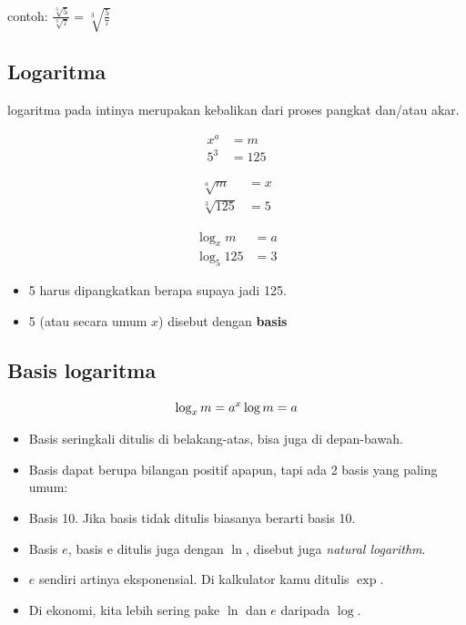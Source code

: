 \documentclass[
  letterpaper,
  DIV=11,
  numbers=noendperiod]{scrartcl}
\begin{document}
contoh: \(\frac{\sqrt[3]{5}}{\sqrt[3]{7}}=\sqrt[3]{\frac{5}{7}}\)

\subsection{Logaritma}\label{logaritma}

logaritma pada intinya merupakan kebalikan dari proses pangkat dan/atau
akar.

\[
\begin{align}
x^a &= m \\
5^3 &= 125
\end{align}
\]

\[
\begin{align}
\sqrt[a]{m} &= x \\
\sqrt[3]{125} &= 5
\end{align}
\]

\[
\begin{align}
\log_x {m} &= a \\
\log_5 {125} &= 3
\end{align}
\]

\begin{itemize}
\item
  5 harus dipangkatkan berapa supaya jadi 125.
\item
  5 (atau secara umum \(x\)) disebut dengan \textbf{basis}
\end{itemize}

\subsection{Basis logaritma}\label{basis-logaritma}

\[
\log_x m=a \\
^x \log m=a
\]

\begin{itemize}
\item
  Basis seringkali ditulis di belakang-atas, bisa juga di depan-bawah.
\item
  Basis dapat berupa bilangan positif apapun, tapi ada 2 basis yang
  paling umum:
\item
  Basis 10. Jika basis tidak ditulis biasanya berarti basis 10.
\item
  Basis \(e\), basis e ditulis juga dengan \(\ln\), disebut juga
  \emph{natural logarithm}.
\item
  \(e\) sendiri artinya eksponensial. Di kalkulator kamu ditulis
  \(\exp\).
\item
  Di ekonomi, kita lebih sering pake \(\ln\) dan \(e\) daripada
  \(\log\).
\end{itemize}
\end{document}
